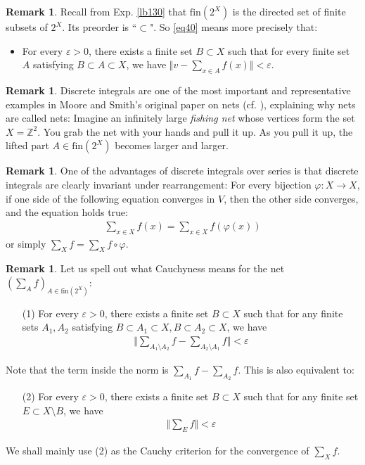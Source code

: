 \documentclass[12pt,b5paper,notitlepage]{article}
\theoremstyle{definition}
\newtheorem{rem}[df]{Remark}
\theoremstyle{plain}
\newcommand{\Zbb}{\mathbb Z}
\newcommand{\fin}{\mathrm{fin}}
\newcommand{\eps}{\varepsilon}
\numberwithin{equation}{section}
\begin{document}
\begin{rem}
Recall from Exp. \ref{lb130} that $\fin(2^X)$ is the directed set of finite subsets of $2^X$. Its preorder is ``$\subset$". So \eqref{eq40} means more precisely that:
\begin{itemize}
\item For every $\eps>0$, there exists a finite set $B\subset X$ such that for every finite set $A$ satisfying $B\subset A\subset X$, we have $\Vert v-\sum_{x\in A}f(x)\Vert<\eps$.
\end{itemize}
\end{rem}


\begin{rem}
Discrete integrals are one of the most important and representative examples in Moore and Smith's original paper on nets (cf. \cite{MS22}), explaining why nets are called nets: Imagine an infinitely large \textit{fishing net} whose vertices form the set $X=\Zbb^2$. You grab the net with your hands and pull it up. As you pull it up, the lifted part $A\in\fin(2^X)$ becomes larger and larger.
\end{rem}


\begin{rem}\label{lb141}
One of the advantages of discrete integrals over series is that  discrete integrals are clearly invariant under rearrangement: For every bijection $\varphi:X\rightarrow X$, if one side of the following equation converges in $V$, then the other side converges, and the equation holds true:
\begin{align}
\sum_{x\in X}f(x)=\sum_{x\in X}f(\varphi(x))
\end{align} 
or simply $\sum_Xf=\sum_Xf\circ\varphi$.
\end{rem}


\begin{rem}\label{lb133}
Let us spell out what Cauchyness means for the net $(\sum_A f)_{A\in\fin(2^X)}$:
\begin{itemize}
\item[(1)] For every $\eps>0$, there exists a finite set $B\subset X$ such that for any finite sets $A_1,A_2$ satisfying $B\subset A_1\subset X,B\subset A_2\subset X$, we have
\begin{align*}
\Big\Vert \sum_{A_1\setminus A_2}f-\sum_{A_2\setminus A_1}f \Big\Vert<\eps
\end{align*} 
\end{itemize}
Note that the term inside the norm is $\sum_{A_1}f-\sum_{A_2}f$. This is also equivalent to:
\begin{itemize}
\item[(2)] For every $\eps>0$, there exists a finite set $B\subset X$ such that for any finite set $E\subset X\setminus B$, we have 
\begin{align*}
\Big\Vert \sum_Ef\Big\Vert<\eps
\end{align*}
\end{itemize}
We shall mainly use (2) as the Cauchy criterion for the convergence of $\sum_Xf$.
\end{rem}
\end{document}
